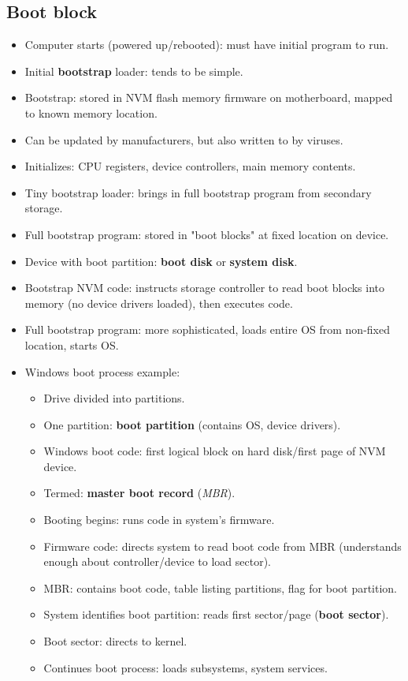 \subsection{Boot block}
\begin{itemize}
    \item Computer starts (powered up/rebooted): must have initial program to run.
    \item Initial \textbf{bootstrap} loader: tends to be simple.
    \item Bootstrap: stored in NVM flash memory firmware on motherboard, mapped to known memory location.
    \item Can be updated by manufacturers, but also written to by viruses.
    \item Initializes: CPU registers, device controllers, main memory contents.
    \item Tiny bootstrap loader: brings in full bootstrap program from secondary storage.
    \item Full bootstrap program: stored in "boot blocks" at fixed location on device.
    \item Device with boot partition: \textbf{boot disk} or \textbf{system disk}.
    \item Bootstrap NVM code: instructs storage controller to read boot blocks into memory (no device drivers loaded), then executes code.
    \item Full bootstrap program: more sophisticated, loads entire OS from non-fixed location, starts OS.
    \item Windows boot process example:
    \begin{itemize}
        \item Drive divided into partitions.
        \item One partition: \textbf{boot partition} (contains OS, device drivers).
        \item Windows boot code: first logical block on hard disk/first page of NVM device.
        \item Termed: \textbf{master boot record} (\textit{MBR}).
        \item Booting begins: runs code in system's firmware.
        \item Firmware code: directs system to read boot code from MBR (understands enough about controller/device to load sector).
        \item MBR: contains boot code, table listing partitions, flag for boot partition.
        \item System identifies boot partition: reads first sector/page (\textbf{boot sector}).
        \item Boot sector: directs to kernel.
        \item Continues boot process: loads subsystems, system services.
    \end{itemize}
\end{itemize}

